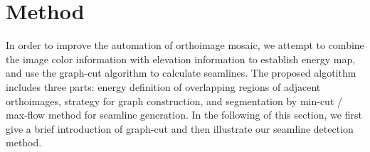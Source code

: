 \documentclass[journal]{IEEEtran}
\begin{document}
\section{Method}
In order to improve the automation of orthoimage mosaic, we attempt to combine the image color information with elevation information to establish energy map, and use the graph-cut algorithm to calculate seamlines. The proposed algotithm includes three parts:  energy definition of overlapping regions of adjacent orthoimages, strategy for graph construction, and segmentation by min-cut / max-flow method for seamline generation. In the following of this section, we first give a brief introduction of graph-cut and then illustrate our seamline detection method.\par

\end{document}
